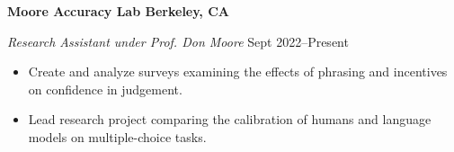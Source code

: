 \textbf{Moore Accuracy Lab \hfill Berkeley, CA}\par

\textit{Research Assistant under Prof. Don Moore} \hfill Sept 2022--Present\par
\begin{itemize}
	\item Create and analyze surveys examining the effects of phrasing and incentives on confidence in judgement.
	\item Lead research project comparing the calibration of humans and language models on multiple-choice tasks.
\end{itemize}\par